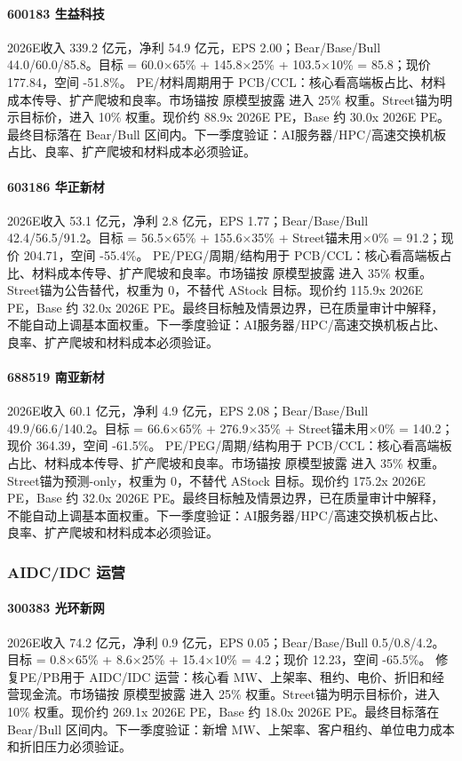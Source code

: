 \paragraph{600183 生益科技} 2026E收入 339.2 亿元，净利 54.9 亿元，EPS 2.00；Bear/Base/Bull 44.0/60.0/85.8。目标 = 60.0×65\% + 145.8×25\% + 103.5×10\% = 85.8；现价 177.84，空间 -51.8\%。 PE/材料周期用于 PCB/CCL：核心看高端板占比、材料成本传导、扩产爬坡和良率。市场锚按 原模型披露 进入 25\% 权重。Street锚为明示目标价，进入 10\% 权重。现价约 88.9x 2026E PE，Base 约 30.0x 2026E PE。最终目标落在 Bear/Bull 区间内。下一季度验证：AI服务器/HPC/高速交换机板占比、良率、扩产爬坡和材料成本必须验证。
\paragraph{603186 华正新材} 2026E收入 53.1 亿元，净利 2.8 亿元，EPS 1.77；Bear/Base/Bull 42.4/56.5/91.2。目标 = 56.5×65\% + 155.6×35\% + Street锚未用×0\% = 91.2；现价 204.71，空间 -55.4\%。 PE/PEG/周期/结构用于 PCB/CCL：核心看高端板占比、材料成本传导、扩产爬坡和良率。市场锚按 原模型披露 进入 35\% 权重。Street锚为公告替代，权重为 0，不替代 AStock 目标。现价约 115.9x 2026E PE，Base 约 32.0x 2026E PE。最终目标触及情景边界，已在质量审计中解释，不能自动上调基本面权重。下一季度验证：AI服务器/HPC/高速交换机板占比、良率、扩产爬坡和材料成本必须验证。
\paragraph{688519 南亚新材} 2026E收入 60.1 亿元，净利 4.9 亿元，EPS 2.08；Bear/Base/Bull 49.9/66.6/140.2。目标 = 66.6×65\% + 276.9×35\% + Street锚未用×0\% = 140.2；现价 364.39，空间 -61.5\%。 PE/PEG/周期/结构用于 PCB/CCL：核心看高端板占比、材料成本传导、扩产爬坡和良率。市场锚按 原模型披露 进入 35\% 权重。Street锚为预测-only，权重为 0，不替代 AStock 目标。现价约 175.2x 2026E PE，Base 约 32.0x 2026E PE。最终目标触及情景边界，已在质量审计中解释，不能自动上调基本面权重。下一季度验证：AI服务器/HPC/高速交换机板占比、良率、扩产爬坡和材料成本必须验证。
\subsubsection*{AIDC/IDC 运营}
\paragraph{300383 光环新网} 2026E收入 74.2 亿元，净利 0.9 亿元，EPS 0.05；Bear/Base/Bull 0.5/0.8/4.2。目标 = 0.8×65\% + 8.6×25\% + 15.4×10\% = 4.2；现价 12.23，空间 -65.5\%。 修复PE/PB用于 AIDC/IDC 运营：核心看 MW、上架率、租约、电价、折旧和经营现金流。市场锚按 原模型披露 进入 25\% 权重。Street锚为明示目标价，进入 10\% 权重。现价约 269.1x 2026E PE，Base 约 18.0x 2026E PE。最终目标落在 Bear/Bull 区间内。下一季度验证：新增 MW、上架率、客户租约、单位电力成本和折旧压力必须验证。
